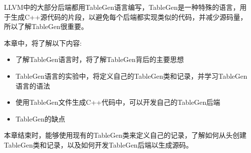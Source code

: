 LLVM中的大部分后端都用TableGen语言编写，TableGen是一种特殊的语言，用于生成C++源代码的片段，以避免每个后端都实现类似的代码，并减少源码量，所以了解TableGen很重要。

本章中，将了解以下内容:

\begin{itemize}
\item
了解TableGen语言时，将了解TableGen背后的主要思想

\item
TableGen语言的实验中，将定义自己的TableGen类和记录，并学习TableGen语言的语法

\item
使用TableGen文件生成C++代码中，可以开发自己的TableGen后端

\item
TableGen的缺点
\end{itemize}

本章结束时，能够使用现有的TableGen类来定义自己的记录，了解如何从头创建TableGen类和记录，以及如何开发TableGen后端以生成源码。














